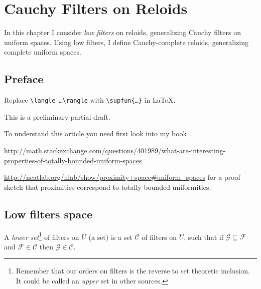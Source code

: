 \chapter{Cauchy Filters on Reloids}

In this chapter I consider \emph{low filters} on reloids, generalizing
Cauchy filters on uniform spaces. Using low filters, I define Cauchy-complete
reloids, generalizing complete uniform spaces.

\section{Preface}

Replace {\tt \textbackslash langle \dots \textbackslash rangle} with {\tt \textbackslash supfun\{\dots\}} in \LaTeX{}.

This is a preliminary partial draft.

To understand this article you need first look into my book \cite{volume-1}.

\url{http://math.stackexchange.com/questions/401989/what-are-interesting-properties-of-totally-bounded-uniform-spaces}

\url{http://ncatlab.org/nlab/show/proximity+space\#uniform\_spaces} for a proof
sketch that proximities correspond to totally bounded uniformities.

\section{Low filters space}


\begin{defn}
A \emph{lower set}\footnote{Remember that our orders on filters is the
reverse to set theoretic inclusion. It could be called an \emph{upper} set
in other sources.} of filters on $U$ (a set) is a set $\mathscr{C}$
of filters on $U$, such that if $\mathcal{G} \sqsubseteq
\mathcal{F}$ and $\mathcal{F} \in \mathscr{C}$ then $\mathcal{G} \in
\mathscr{C}$.
\end{defn}

